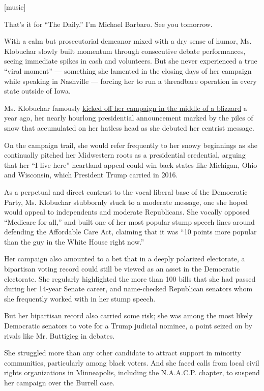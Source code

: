 {[}music{]}

That's it for ``The Daily.'' I'm Michael Barbaro. See you tomorrow.

With a calm but prosecutorial demeanor mixed with a dry sense of humor,
Ms. Klobuchar slowly built momentum through consecutive debate
performances, seeing immediate spikes in cash and volunteers. But she
never experienced a true ``viral moment'' --- something she lamented in
the closing days of her campaign while speaking in Nashville --- forcing
her to run a threadbare operation in every state outside of Iowa.

Ms. Klobuchar famously
\href{https://www.nytimes.com/2019/02/10/us/politics/amy-klobuchar-president-2020.html}{kicked
off her campaign in the middle of a blizzard} a year ago, her nearly
hourlong presidential announcement marked by the piles of snow that
accumulated on her hatless head as she debuted her centrist message.

On the campaign trail, she would refer frequently to her snowy
beginnings as she continually pitched her Midwestern roots as a
presidential credential, arguing that her ``I live here'' heartland
appeal could win back states like Michigan, Ohio and Wisconsin, which
President Trump carried in 2016.

As a perpetual and direct contrast to the vocal liberal base of the
Democratic Party, Ms. Klobuchar stubbornly stuck to a moderate message,
one she hoped would appeal to independents and moderate Republicans. She
vocally opposed ``Medicare for all,'' and built one of her most popular
stump speech lines around defending the Affordable Care Act, claiming
that it was ``10 points more popular than the guy in the White House
right now.''

Her campaign also amounted to a bet that in a deeply polarized
electorate, a bipartisan voting record could still be viewed as an asset
in the Democratic electorate. She regularly highlighted the more than
100 bills that she had passed during her 14-year Senate career, and
name-checked Republican senators whom she frequently worked with in her
stump speech.

But her bipartisan record also carried some risk; she was among the most
likely Democratic senators to vote for a Trump judicial nominee, a point
seized on by rivals like Mr. Buttigieg in debates.

She struggled more than any other candidate to attract support in
minority communities, particularly among black voters. And she faced
calls from local civil rights organizations in Minneapolis, including
the N.A.A.C.P. chapter, to suspend her campaign over the Burrell case.

